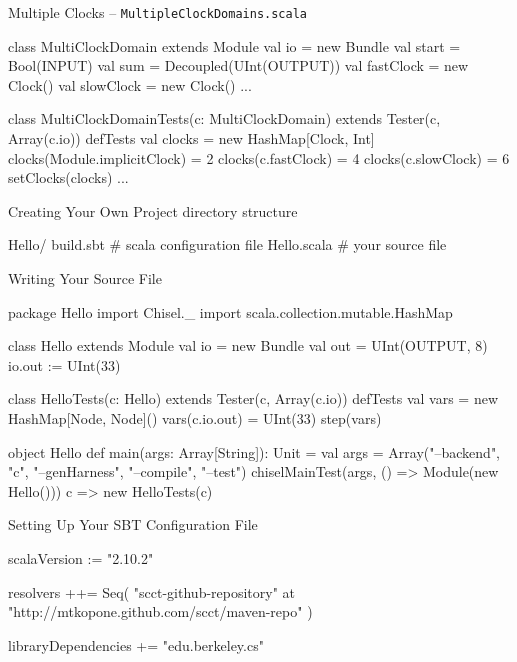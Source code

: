 \documentclass[xcolor=pdflatex,dvipsnames,table]{beamer}
\begin{document}
\begin{frame}[fragile]{Multiple Clocks -- \tt MultipleClockDomains.scala}
\begin{scala}
class MultiClockDomain extends Module {
  val io = new Bundle {
    val start = Bool(INPUT)
    val sum = Decoupled(UInt(OUTPUT))
  }
  val fastClock = new Clock()
  val slowClock = new Clock()
  ...
}

class MultiClockDomainTests(c: MultiClockDomain) 
    extends Tester(c, Array(c.io)) {
  defTests {
    val clocks = new HashMap[Clock, Int]
    clocks(Module.implicitClock) = 2
    clocks(c.fastClock) = 4
    clocks(c.slowClock) = 6
    setClocks(clocks)
    ...
  }
}
\end{scala}
\end{frame}

\begin{frame}[fragile]{Creating Your Own Project}
directory structure
\begin{bash}
Hello/
  build.sbt   # scala configuration file
  Hello.scala # your source file
\end{bash}

\end{frame}

\begin{frame}[fragile]{Writing Your Source File}

{
\begin{scala}
package Hello
import Chisel._
import scala.collection.mutable.HashMap

class Hello extends Module {
  val io = new Bundle { 
    val out = UInt(OUTPUT, 8) }
  io.out := UInt(33)
}

class HelloTests(c: Hello) extends Tester(c, Array(c.io)) {
  defTests {
    val vars = new HashMap[Node, Node]()
    vars(c.io.out) = UInt(33)
    step(vars)
  }
}

object Hello {
  def main(args: Array[String]): Unit = {
    val args = Array("--backend", "c", "--genHarness", "--compile", "--test")
    chiselMainTest(args, () => Module(new Hello())) {
      c => new HelloTests(c) }
} }
\end{scala}
}

\end{frame}

\begin{frame}[fragile]{Setting Up Your SBT Configuration File}
\begin{scala}
scalaVersion := "2.10.2"

resolvers ++= Seq(
  "scct-github-repository" at "http://mtkopone.github.com/scct/maven-repo"
)

libraryDependencies += 
  "edu.berkeley.cs" %
\end{scala}
\end{frame}
\end{document}
